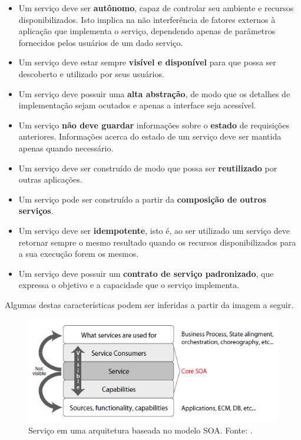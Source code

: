 \begin{itemize}
\item Um serviço deve ser \textbf{autônomo},  capaz de controlar seu ambiente e recursos disponibilizados. Isto implica na não interferência de fatores externos à aplicação que implementa o serviço, dependendo apenas de parâmetros fornecidos pelos usuários de um dado serviço.

\item Um serviço deve estar sempre \textbf{visível e disponível} para que possa ser descoberto e utilizado por seus usuários.

\item Um serviço deve possuir uma \textbf{alta abstração}, de modo que os detalhes de implementação sejam ocutados e apenas a interface seja acessível.

\item Um serviço \textbf{não deve guardar} informações sobre o \textbf{estado} de requisições anteriores. Informações acerca do estado de um serviço deve ser mantida apenas quando necessário.

\item Um serviço deve ser construído de modo que possa ser \textbf{reutilizado} por outras aplicações.

\item Um serviço pode ser construído a partir da \textbf{composição de outros serviços}.

\item Um serviço deve ser \textbf{idempotente}, isto é, ao ser utilizado um serviço deve retornar sempre o mesmo resultado quando os recursos disponibilizados para a sua execução forem os mesmos.

\item Um serviço deve possuir um \textbf{contrato de serviço padronizado}, que expressa o objetivo e a capacidade que o serviço implementa.
\end{itemize}

Algumas destas características podem ser inferidas a partir da imagem a seguir.

\begin{figure}[htb]
\centering
\includegraphics[scale=0.8]{figuras/servico_na_arquitetura.png}
\caption{Serviço em uma arquitetura baseada no modelo SOA. Fonte: \cite{nickull_service_2007}.}
\label{servico_na_arquitetura}
\end{figure}

